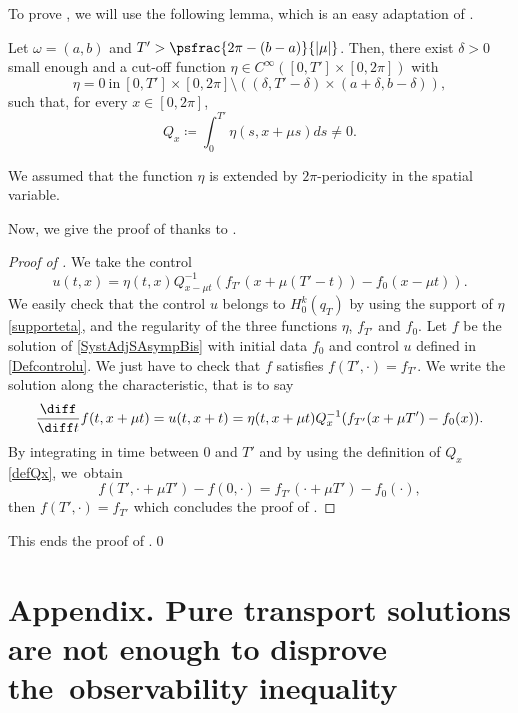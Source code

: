 To prove , we will use the following lemma, which is an easy adaptation of \cite[Lem.\,2.6]{alabau-boussouira_2017}.
\begin{lemma}\label{LemmaCutOffTransport}
Let $\omega = (a,b)$ and $T' > \psfrac{2 \pi -(b-a)}{|\mu|}$. Then, there exist $\delta >0$ small enough and a cut-off function $\eta \in C^{\infty}([0,T']\times [0, 2\pi])$ with
\begin{equation}
\label{supporteta}
\eta = 0\ \text{in}\ [0,T']\times[0,2\pi] \setminus ((\delta, T'-\delta)\times (a+\delta, b-\delta)),
\end{equation}
such that, for every $x \in [0, 2 \pi]$,
\begin{equation}
\label{defQx}
Q_x \coloneqq \int_0^{T'} \eta(s, x + \mu s) ds \neq 0.
\end{equation}
\end{lemma}
\begin{remark}
We assumed that the function $\eta$ is extended by $2\pi$-periodicity in the spatial variable.
\end{remark}
Now, we give the proof of  thanks to .
\begin{proof}[Proof of ]
We take the control
\begin{equation}
\label{Defcontrolu}
u(t,x) = \eta(t,x) Q_{x-\mu t}^{-1}(f_{T'}(x+\mu(T'-t))-f_{0}(x-\mu t)).
\end{equation}
We easily check that the control $u$ belongs to $H_0^{k}(q_T)$ by using the support of $\eta$ \eqref{supporteta}, and the regularity of the three functions $\eta$, $f_{T'}$ and $f_0$. Let $f$ be the solution of \eqref{SystAdjSAsympBis} with initial data $f_0$ and control $u$ defined in \eqref{Defcontrolu}. We just have to check that $f$ satisfies $f(T',\cdot)=f_{T'}$. We write the solution along the characteristic, that is to say
\[
\frac{\diff}{\diff t} f(t, x + \mu t) = u(t,x+t) = \eta(t,x+\mu t) Q_x^{-1}(f_{T'}(x+\mu T')-f_{0}(x)).
\]
By integrating in time between $0$ and $T'$ and by using the definition of $Q_x$ \eqref{defQx}, we~obtain
\[
f(T', \cdot + \mu T') - f(0,\cdot) = f_{T'}(\cdot+ \mu T') - f_0(\cdot),
\]
then $f(T',\cdot) = f_{T'}$ which concludes the proof of .
\end{proof}
This ends the proof of .\qed

\appendix{}
\section*{Appendix. Pure transport solutions are not enough to disprove the~observability inequality}
\label{app:transport}

